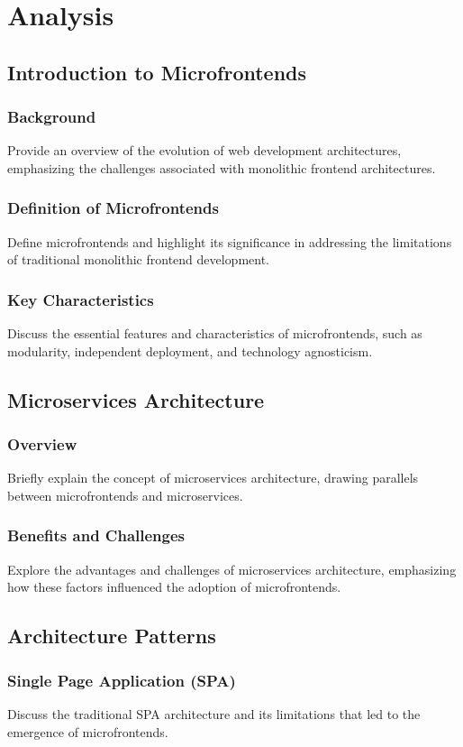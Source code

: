 \chapter{Analysis}
\label{chap:Analysis} 

\section{Introduction to Microfrontends}
\subsection{Background}
Provide an overview of the evolution of web development architectures, emphasizing the challenges associated with monolithic frontend architectures.
\subsection{Definition of Microfrontends}
Define microfrontends and highlight its significance in addressing the limitations of traditional monolithic frontend development.
\subsection{Key Characteristics}
Discuss the essential features and characteristics of microfrontends, such as modularity, independent deployment, and technology agnosticism.

\section{Microservices Architecture}
\subsection{Overview}
Briefly explain the concept of microservices architecture, drawing parallels between microfrontends and microservices.
\subsection{Benefits and Challenges}
Explore the advantages and challenges of microservices architecture, emphasizing how these factors influenced the adoption of microfrontends.

\section{Architecture Patterns}
\subsection{Single Page Application (SPA)}
Discuss the traditional SPA architecture and its limitations that led to the emergence of microfrontends.
